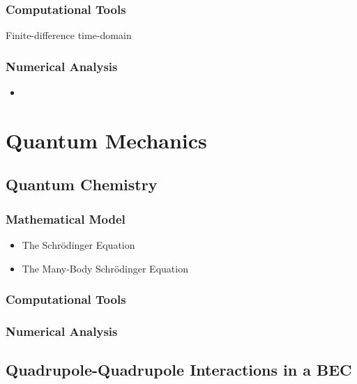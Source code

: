\documentclass{report}
\begin{document}
        \subsection{Computational Tools}

            Finite-difference time-domain

        \subsection{Numerical Analysis}

            \begin{itemize}
                \item 
            \end{itemize}

\chapter{Quantum Mechanics} \label{sec:quantum}

    \section{Quantum Chemistry}

        \subsection{Mathematical Model}

            \begin{itemize}
                \item The Schr{\"o}dinger Equation
                \item The Many-Body Schr{\"o}dinger Equation
            \end{itemize}

        \subsection{Computational Tools}

        \subsection{Numerical Analysis}

    \section{Quadrupole-Quadrupole Interactions in a BEC}
\end{document}
